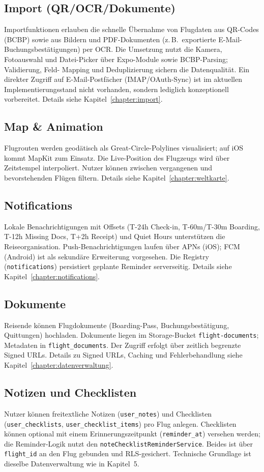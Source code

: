 \subsection{Import (QR/OCR/Dokumente)}
Importfunktionen erlauben die schnelle Übernahme von Flugdaten aus QR-Codes
(BCBP) sowie aus Bildern und PDF-Dokumenten (z.\,B.\ exportierte E-Mail-
Buchungsbestätigungen) per OCR. Die Umsetzung nutzt die Kamera, Fotoauswahl
und Datei-Picker über Expo-Module sowie BCBP-Parsing; Validierung, Feld-
Mapping und Deduplizierung sichern die Datenqualität. Ein direkter Zugriff
auf E-Mail-Postfächer (IMAP/OAuth-Sync) ist im aktuellen Implementierungsstand
nicht vorhanden, sondern lediglich konzeptionell vorbereitet. Details siehe
Kapitel~\ref{chapter:import}.

\subsection{Map \& Animation}
Flugrouten werden geodätisch als Great-Circle-Polylines visualisiert; auf iOS
kommt MapKit zum Einsatz. Die Live-Position des Flugzeugs wird über Zeitstempel
interpoliert. Nutzer können zwischen vergangenen und bevorstehenden Flügen
filtern. Details siehe Kapitel~\ref{chapter:weltkarte}.

\subsection{Notifications}
Lokale Benachrichtigungen mit Offsets (T-24h Check-in, T-60m/T-30m Boarding,
T-12h Missing Docs, T+2h Receipt) und Quiet Hours unterstützen die
Reiseorganisation. Push-Benachrichtigungen laufen über APNs (iOS); FCM (Android)
ist als sekundäre Erweiterung vorgesehen. Die Registry (\texttt{notifications})
persistiert geplante Reminder serverseitig. Details siehe
Kapitel~\ref{chapter:notifications}.

\subsection{Dokumente}
Reisende können Flugdokumente (Boarding-Pass, Buchungsbestätigung, Quittungen)
hochladen. Dokumente liegen im Storage-Bucket \texttt{flight-documents};
Metadaten in \texttt{flight\_documents}. Der Zugriff erfolgt über zeitlich
begrenzte Signed URLs. Details zu Signed URLs, Caching und Fehlerbehandlung
siehe Kapitel~\ref{chapter:datenverwaltung}.

\subsection{Notizen und Checklisten}
Nutzer können freitextliche Notizen (\texttt{user\_notes}) und Checklisten
(\texttt{user\_checklists}, \texttt{user\_checklist\_items}) pro Flug anlegen.
Checklisten können optional mit einem Erinnerungszeitpunkt (\texttt{reminder\_at})
versehen werden; die Reminder-Logik nutzt den \texttt{noteChecklistReminderService}.
Beides ist über \texttt{flight\_id} an den Flug gebunden und RLS-gesichert.
Technische Grundlage ist dieselbe Datenverwaltung wie in Kapitel~5.

